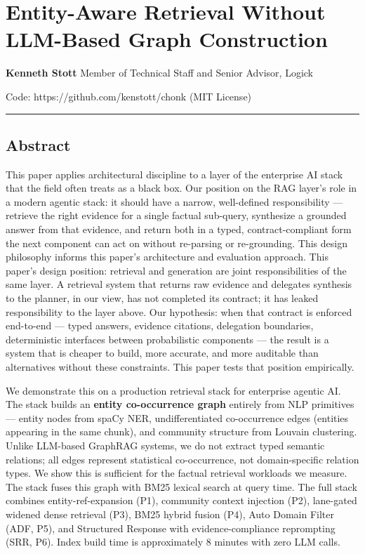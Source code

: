 \section{Entity-Aware Retrieval Without LLM-Based Graph Construction}\label{entity-aware-retrieval-without-llm-based-graph-construction}

\textbf{Kenneth Stott} Member of Technical Staff and Senior Advisor, Logick

Code: https://github.com/kenstott/chonk (MIT License)

\begin{center}\rule{0.5\linewidth}{0.5pt}\end{center}

\subsection{Abstract}\label{abstract}

This paper applies architectural discipline to a layer of the enterprise AI stack that the field often treats as a black box. Our position on the RAG layer's role in a modern agentic stack: it should have a narrow, well-defined responsibility --- retrieve the right evidence for a single factual sub-query, synthesize a grounded answer from that evidence, and return both in a typed, contract-compliant form the next component can act on without re-parsing or re-grounding. This design philosophy informs this paper's architecture and evaluation approach. This paper's design position: retrieval and generation are joint responsibilities of the same layer. A retrieval system that returns raw evidence and delegates synthesis to the planner, in our view, has not completed its contract; it has leaked responsibility to the layer above. Our hypothesis: when that contract is enforced end-to-end --- typed answers, evidence citations, delegation boundaries, deterministic interfaces between probabilistic components --- the result is a system that is cheaper to build, more accurate, and more auditable than alternatives without these constraints. This paper tests that position empirically.

We demonstrate this on a production retrieval stack for enterprise agentic AI. The stack builds an \textbf{entity co-occurrence graph} entirely from NLP primitives --- entity nodes from spaCy NER, undifferentiated co-occurrence edges (entities appearing in the same chunk), and community structure from Louvain clustering. Unlike LLM-based GraphRAG systems, we do not extract typed semantic relations; all edges represent statistical co-occurrence, not domain-specific relation types. We show this is sufficient for the factual retrieval workloads we measure. The stack fuses this graph with BM25 lexical search at query time. The full stack combines entity-ref-expansion (P1), community context injection (P2), lane-gated widened dense retrieval (P3), BM25 hybrid fusion (P4), Auto Domain Filter (ADF, P5), and Structured Response with evidence-compliance reprompting (SRR, P6). Index build time is approximately 8 minutes with zero LLM calls.


